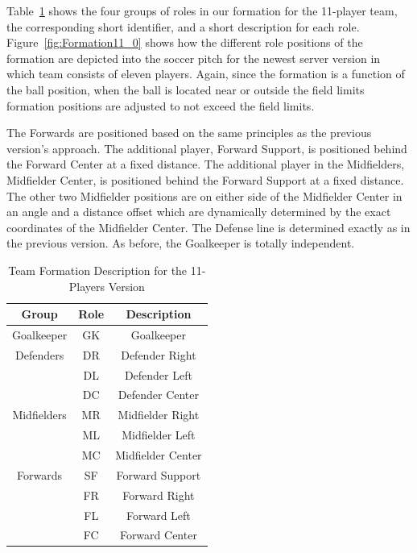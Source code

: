 Table~\ref{TeamFormation11} shows the four groups of roles in our formation for the 11-player team, the corresponding short identifier, and a short description for each role.
Figure~\ref{fig:Formation11_0} shows how the different role positions of the formation are depicted into the soccer pitch for the newest server version in which team consists of eleven players. Again, since the formation is a function of the ball position, when the ball is located near or outside the field limits formation positions are adjusted to not exceed the field limits.

The Forwards are positioned based on the same principles as the previous version's approach. The additional player, Forward Support, is positioned behind the Forward Center at a fixed distance. The additional player in the Midfielders, Midfielder Center, is positioned behind  the Forward Support at a fixed distance. The other two Midfielder positions are on either side of the Midfielder Center in an angle and a distance offset which are dynamically determined by the exact coordinates of the Midfielder Center. The Defense line is determined exactly as in the previous version. As before, the Goalkeeper is totally independent. 





\begin{table}[t!]
\vspace*{-0.5cm}
\caption{Team Formation Description for the 11-Players Version}
\label{TeamFormation11}
\begin{center}
    \begin{tabular}{ccc}
    \textbf{Group} 	& \textbf{Role} & \textbf{Description}  \\
    \midrule
	Goalkeeper 		     & GK		& Goalkeeper  \\ 
    Defenders			& DR		& Defender Right			\\
     						& DL		& Defender Left		 	\\
    						& DC		& Defender Center			\\
    Midfielders			    & MR		& Midfielder Right			\\
     						& ML		& Midfielder Left			\\
     						& MC		& Midfielder Center			\\
    Forwards 	  	  	& SF		& Forward Support         \\
     						& FR		& Forward Right		 	\\
     					& FL		& Forward Left		 	\\
     					& FC   	    & Forward Center		 
    \end{tabular}
\end{center}
\vspace*{-0.9cm}
\end{table}



